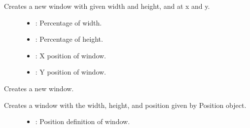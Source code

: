 \documentclass[letterpaper,10pt,english]{sphinxmanual}
\begin{document}
\begin{fulllineitems}
\begin{fulllineitems}
Creates a new window with given width and height, and at x and y. \begin{description}
\item[{}] \leavevmode
{\hyperref[\detokenize{index:Pessumnamespaceostendo_1a4c5850c8a109e159e874ecce8a5dc62a}]{}} 

\item[{}] \leavevmode\begin{itemize}
\item {} 
: Percentage of width. 

\item {} 
: Percentage of height. 

\item {} 
: X position of window. 

\item {} 
: Y position of window. 

\end{itemize}

\end{description}


\end{fulllineitems}


\begin{fulllineitems}
\label{\detokenize{index:_CPPv2N7ostendo6Window6WindowE3Pos}}%
\pysigstartmultiline
{}\label{\detokenize{index:Pessumclassostendo_1_1Window_1a24f1dce7d66fb8ffec6d36e191656ec9}}%
\pysigstopmultiline
Creates a new window. 

Creates a window with the width, height, and position given by Position object. \begin{description}
\item[{}] \leavevmode
{\hyperref[\detokenize{index:Pessumstructostendo_1_1Pos}]{}} 

\item[{}] \leavevmode\begin{itemize}
\item {} 
: Position definition of window. 


\end{itemize}
\end{description}
\end{fulllineitems}
\end{fulllineitems}
\end{document}
